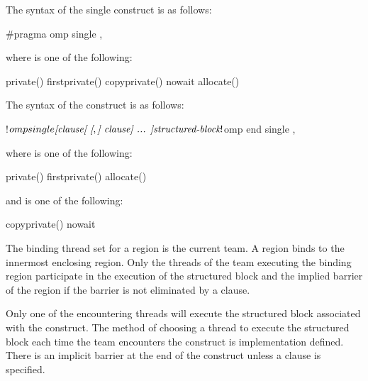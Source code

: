 \syntax
\begin{ccppspecific}
The syntax of the single construct is as follows:

\begin{ompcPragma}
#pragma omp single \plc{[clause[ [},\plc{] clause] ... ] new-line}
\end{ompcPragma}

\begin{samepage}
where  is one of the following:

\begin{indentedcodelist}
private()
firstprivate()
copyprivate()
nowait
allocate(\plc{[allocator: ]})
\end{indentedcodelist}
\end{samepage}
\end{ccppspecific}

\begin{fortranspecific}
The syntax of the  construct is as follows:

\begin{ompfPragma}
!$omp single \plc{[clause[ [},\plc{] clause] ... ]}
   \plc{structured-block}
!$omp end single \plc{[end_clause[ [},\plc{] end_clause] ... ]}
\end{ompfPragma}

where  is one of the following:

\begin{indentedcodelist}
private()
firstprivate()
allocate(\plc{[allocator: ]})
\end{indentedcodelist}

and  is one of the following:

\begin{indentedcodelist}
copyprivate()
nowait
\end{indentedcodelist}
\end{fortranspecific}

\binding
The binding thread set for a  region is the current team. A  region
binds to the innermost enclosing  region. Only the threads of the team
executing the binding  region participate in the execution of the structured
block and the implied barrier of the  region if the barrier is not eliminated by a
 clause.

\descr
Only one of the encountering threads will execute the structured block associated with the 
construct. The method of choosing a thread to execute the structured block each time the team encounters the construct
is implementation defined. There is an implicit barrier at the end of the  construct unless a
 clause is specified.

